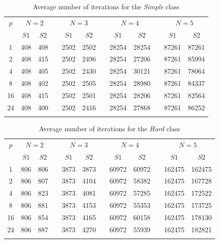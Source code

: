 \documentclass[smallcondensed]{svjour3}     %
\begin{document}
\begin{table}
	\caption{Average number of iterations for the \textit{Simple} class}
	\label{tab:1}
	\center
	\begin{tabular}{cccccccccccc}
		\hline\noalign{\smallskip}
		$p$ & \multicolumn{2}{c}{ $N=2$ } & & \multicolumn{2}{c}{$N=3$} & & \multicolumn{2}{c}{$N=4$} & & \multicolumn{2}{c}{$N=5$}  \\
		\noalign{\smallskip} \cline{2-3} \cline{5-6} \cline{8-9} \cline{11-12}  \noalign{\smallskip}
		 & $S1$ & $S2$ & & $S1$ & $S2$ & & $S1$ & $S2$ & & $S1$ & $S2$  \\
		\noalign{\smallskip} \hline \noalign{\smallskip}
1	&	408	&	408	&	&	2502	&	2502	&	&	28254	&	28254	&	&	87261	&	87261	\\
2	&	408	&	415	&	&	2502	&	2496	&	&	28254	&	27206	&	&	87261	&	85994	\\
4	&	408	&	405	&	&	2502	&	2430	&	&	28254	&	30121	&	&	87261	&	78064	\\
8	&	408	&	402	&	&	2502	&	2505	&	&	28254	&	28980	&	&	87261	&	84337	\\
16	&	408	&	415	&	&	2502	&	2501	&	&	28254	&	28206	&	&	87261	&	82564	\\
24	&	408	&	400	&	&	2502	&	2416	&	&	28254	&	27868	&	&	87261	&	86252	\\
		\noalign{\smallskip}\hline
	\end{tabular}
\end{table}


\begin{table}
	\caption{Average number of iterations for the \textit{Hard} class}
	\label{tab:2}
	\center
	\begin{tabular}{cccccccccccc}
		\hline\noalign{\smallskip}
		$p$ & \multicolumn{2}{c}{ $N=2$ } & & \multicolumn{2}{c}{$N=3$} & & \multicolumn{2}{c}{$N=4$} & & \multicolumn{2}{c}{$N=5$}  \\
		\noalign{\smallskip} \cline{2-3} \cline{5-6} \cline{8-9} \cline{11-12}  \noalign{\smallskip}
		 & $S1$ & $S2$ & & $S1$ & $S2$ & & $S1$ & $S2$ & & $S1$ & $S2$  \\
		\noalign{\smallskip} \hline \noalign{\smallskip}
1	&	806	&	806	&	&	3873	&	3873	&	&	60972	&	60972	&	&	162475	&	162475	\\
2	&	806	&	807	&	&	3873	&	4104	&	&	60972	&	58382	&	&	162475	&	167728	\\
4	&	806	&	823	&	&	3873	&	4081	&	&	60972	&	57285	&	&	162475	&	172522	\\
8	&	806	&	881	&	&	3873	&	4153	&	&	60972	&	55353	&	&	162475	&	173725	\\
16	&	806	&	854	&	&	3873	&	4165	&	&	60972	&	60158	&	&	162475	&	178130	\\
24	&	806	&	887	&	&	3873	&	4270	&	&	60972	&	55939	&	&	162475	&	182821	\\
		\noalign{\smallskip}\hline
	\end{tabular}
\end{table}
\end{document}

